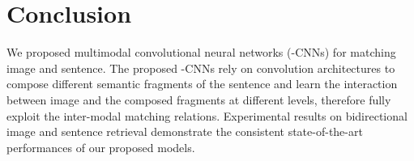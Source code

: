 \documentclass[10pt,twocolumn,letterpaper]{article}
\begin{document}
\section{Conclusion}


We proposed multimodal convolutional neural networks (-CNNs) for matching image and sentence. The proposed -CNNs rely on convolution architectures to compose different semantic fragments of the sentence and learn the interaction between image and the composed fragments at different levels, therefore fully exploit the inter-modal matching relations. Experimental results on bidirectional image and sentence retrieval demonstrate the consistent state-of-the-art performances of our proposed models.


{\small


}
\end{document}
